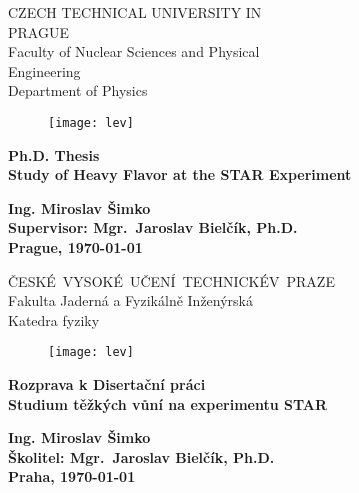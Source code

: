 \documentclass[a4paper,titlepage,11pt]{book} %
\newcommand{\myself}{Ing. Miroslav Šimko}
\newcommand{\engtitle}{Study of Heavy Flavor at the STAR Experiment}
\newcommand{\czechtitle}{Studium těžkých vůní na experimentu STAR}
\newcommand{\skolitel}{Mgr.\ Jaroslav Bielčík, Ph.D.}
\begin{document}
\thispagestyle{empty}
\setcounter{page}{1}
\begin{center}
    {\LARGE \textsc CZECH TECHNICAL UNIVERSITY IN \\[0.3cm]PRAGUE}\\[2ex]
    {\LARGE \textsc Faculty of Nuclear Sciences and Physical \\[0.2cm]Engineering}\\[2ex]
    {\LARGE \textsc Department of Physics}\\
    \vspace{1cm}
    \begin{figure}[ht!]
    \begin{center}
      {\texttt{[image: lev]}}
    \end{center}
    \end{figure}
    \vspace{1cm}

    {\textbf {\Huge Ph.D. Thesis \\[4ex]}
    {\LARGE \bf \engtitle} 
    }

    \vfill

    {\Large \bf \myself }\\ [4ex]
    {\large \bf  Supervisor: \skolitel}\\[4ex]
    {\Large \bf Prague, \justyear\today}\\
    \newpage \rule{0pt}{2cm}
\end{center}
\thispagestyle{empty}
\begin{center}
    {\LARGE \textsc \mbox{\v{C}ESK\' E VYSOKÉ U\v CEN\' I TECHNICK\' E \\[0.3cm]V PRAZE}}\\[2ex]
    {\LARGE \textsc Fakulta Jadern\' a a Fyzik\' aln\v e In\v zen\' yrsk\' a}\\[2ex]
    {\LARGE \textsc Katedra fyziky}\\
    \vspace{1cm}
    \begin{figure}[ht!]
    \begin{center}
      {\texttt{[image: lev]}}
    \end{center}
    \end{figure}
    \vspace{1cm}

    {\textbf {\Huge Rozprava k Diserta\v cn\' i pr\' aci \\[4ex]}
    {\LARGE \bf \czechtitle} 
    }

    \vfill

    {\Large \bf \myself }\\ [4ex]
    {\large \bf Školitel: \skolitel}\\[4ex]
    {\Large \bf Praha, \justyear\today}\\
    \newpage \rule{0pt}{2cm}
\end{center}
\end{document}
